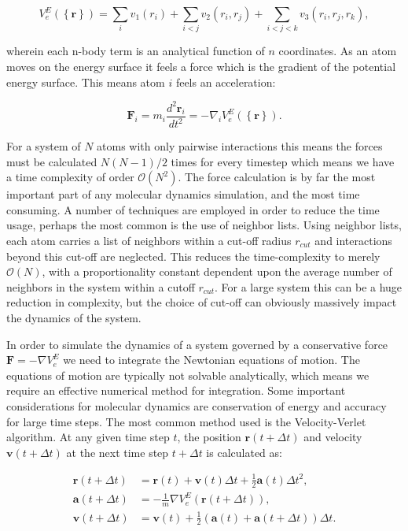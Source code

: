 \begin{equation}
 V_e^E \left(\left\{ \bm{r} \right\}\right) =
    \sum_i v_1(r_i) + \sum_{i < j} v_2(r_i, r_j)
    + \sum_{i < j < k} v_3(r_i, r_j, r_k) , 
\end{equation}

wherein each n-body term is an analytical function
of $n$ coordinates.
As an atom moves on the energy surface
it feels a force which is the gradient of the potential energy surface.
This means atom $i$ feels an acceleration:

\begin{equation}
 \bm{F}_i = m_i \frac{d^2 \bm{r}_i}{dt^2} =
    -\nabla_i V_e^E \left( \left\{ \bm{r} \right\}\right) . 
\end{equation}

For a system of $N$ atoms with only pairwise interactions
this means the forces must be calculated $N(N-1)/2$ times
for every timestep which means we have a time complexity
of order $\mathcal{O}(N^2)$. The force calculation is by far
the most important part of any molecular dynamics simulation,
and the most time consuming.
A number of techniques are employed in order to reduce
the time usage, perhaps the most common is the use of neighbor
lists. Using neighbor lists, each atom carries a list of neighbors
within a cut-off radius $r_{cut}$ and interactions
beyond this cut-off are neglected.
This reduces the time-complexity to merely
$\mathcal{O}(N)$, with a proportionality constant
dependent upon the average number of neighbors in the system
within a cutoff $r_{cut}$. For a large system this can be a
huge reduction in complexity, but the choice of cut-off
can obviously massively impact the dynamics of the system.
\par
In order to simulate the dynamics of a system governed by
a conservative force $\bm{F} = - \nabla V_e^E$
we need to integrate the Newtonian equations of motion.
The equations of motion are typically not solvable
analytically, which means we require an effective numerical
method for integration. Some important considerations
for molecular dynamics are conservation of energy
and accuracy for large time steps.
The most common method used is the Velocity-Verlet algorithm.
At any given time step $t$, the position $\bm{r}(t + \Delta t)$
and velocity $\bm{v}(t + \Delta t)$ at the next time step
$t + \Delta t$ is calculated as:

\begin{equation}
    \begin{split}
        \bm{r}(t + \Delta t)
        &= \bm{r}(t) + \bm{v}(t) \Delta t
        + \frac{1}{2} \bm{a}(t)\Delta t^2 , \\
        \bm{a}(t + \Delta t)
        &= -\frac{1}{m} \nabla V_e^E(\bm{r}(t + \Delta t)) , \\
        \bm{v}(t + \Delta t)
        &= \bm{v}(t) + \frac{1}{2}
        (\bm{a}(t) + \bm{a}(t + \Delta t)) \Delta t .
    \end{split}
\end{equation}


